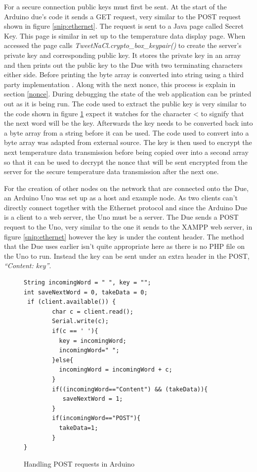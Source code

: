 For a secure connection public keys must first be sent. At the start of the Arduino due's code it sends a GET request, very similar to the POST request shown in figure \ref{snip:ethernet}. The request is sent to a Java page called Secret Key. This page is similar in set up to the temperature data display page. When accessed the page calls \emph{TweetNaCl.crypto\_box\_keypair()} to create the server's private key and corresponding public key. It stores the private key in an array and then prints out the public key to the Due with two terminating characters either side. Before printing the byte array is converted into string using a third party implementation \cite{blah}. Along with the next nonce, this process is explain in section \ref{nonce}. During debugging the state of the web application can be printed out as it is being run. The code used to extract the public key is very similar to the code shown in figure \ref{snip:post} expect it watches for the character < to signify that the next word will be the key. Afterwards the key needs to be converted back into a byte array from a string before it can be used. The code used to convert into a byte array was adapted from external source\cite{String2}. The key is then used to encrypt the next temperature data transmission before being copied over into a second array so that it can be used to decrypt the nonce that will be sent encrypted from the server for the secure temperature data transmission after the next one. 

For the creation of other nodes on the network that are connected onto the Due, an Arduino Uno was set up as a host and example node. As two clients can't directly connect together with the Ethernet protocol and since the Arduino Due is a client to a web server, the Uno must be a server.
The Due sends a POST request to the Uno, very similar to the one it sends to the XAMPP web server, in figure \ref{snip:ethernet} however the key is under the content header. The method that the Due uses earlier isn't quite appropriate here as there is no PHP file on the Uno to run. Instead the key can be sent under an extra header in the POST, \emph{``Content: key''}.

\begin{figure}[H]
\begin{lstlisting}[style=Arduino]
String incomingWord = " ", key = "";
int saveNextWord = 0, takeData = 0;
 if (client.available()) {
        char c = client.read();
        Serial.write(c);
        if(c == ' '){
          key = incomingWord;
          incomingWord=" ";
        }else{
          incomingWord = incomingWord + c;
        }
        if((incomingWord=="Content") && (takeData)){
           saveNextWord = 1; 
        }
        if(incomingWord=="POST"){
          takeData=1;
        }
}
\end{lstlisting}
\caption{Handling POST requests in Arduino}
\label{snip:post}
\end{figure}

